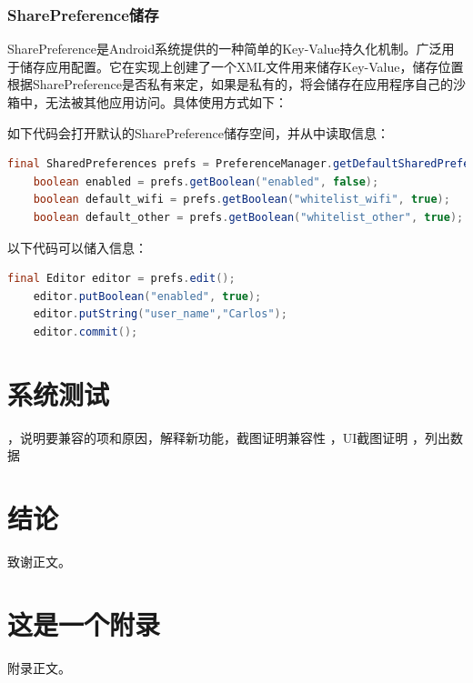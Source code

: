 \documentclass[format=final, language=chinese, degree=bachelor]{hustthesis}
\begin{document}
\subsection{SharePreference储存}

SharePreference是Android系统提供的一种简单的Key-Value持久化机制。广泛用于储存应用配置。它在实现上创建了一个XML文件用来储存Key-Value，储存位置根据SharePreference是否私有来定，如果是私有的，将会储存在应用程序自己的沙箱中，无法被其他应用访问。具体使用方式如下：

如下代码会打开默认的SharePreference储存空间，并从中读取信息：

\begin{lstlisting}[language=java]
    final SharedPreferences prefs = PreferenceManager.getDefaultSharedPreferences(this);
    boolean enabled = prefs.getBoolean("enabled", false);
    boolean default_wifi = prefs.getBoolean("whitelist_wifi", true);
    boolean default_other = prefs.getBoolean("whitelist_other", true);
\end{lstlisting}

以下代码可以储入信息：

\begin{lstlisting}[language=java]
    final Editor editor = prefs.edit();
    editor.putBoolean("enabled", true);
    editor.putString("user_name","Carlos");
    editor.commit();
\end{lstlisting}

\chapter{系统测试}

，说明要兼容的项和原因，解释新功能，截图证明兼容性
，UI截图证明
，列出数据




\chapter{结论}

\backmatter

\begin{ack}
致谢正文。
\end{ack}



\appendix

\chapter{这是一个附录}\label{appendix:1}
附录正文。
\end{document}
